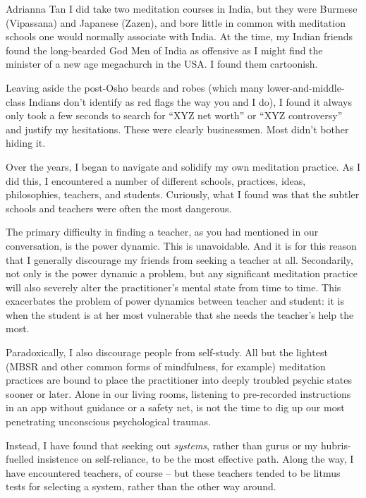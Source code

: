 \documentclass{letter}
\newcommand\hr{\par\vspace{-.5\ht\strutbox}\noindent\hrulefill\par}
\begin{document}
\begin{letter}{Adrianna Tan}
I did take two meditation courses in India, but they were Burmese (Vipassana) and Japanese (Zazen), and bore little in common with meditation schools one would normally associate with India.
At the time, my Indian friends found the long-bearded God Men of India as offensive as I might find the minister of a new age megachurch in the USA.
I found them cartoonish.

Leaving aside the post-Osho beards and robes (which many lower-and-middle-class Indians don't identify as red flags the way you and I do), I found it always only took a few seconds to search for ``XYZ net worth'' or ``XYZ controversy'' and justify my hesitations.
These were clearly businessmen.
Most didn't bother hiding it.

Over the years, I began to navigate and solidify my own meditation practice.
As I did this, I encountered a number of different schools, practices, ideas, philosophies, teachers, and students.
Curiously, what I found was that the subtler schools and teachers were often the most dangerous.

\hr

The primary difficulty in finding a teacher, as you had mentioned in our conversation, is the power dynamic.
This is unavoidable.
And it is for this reason that I generally discourage my friends from seeking a teacher at all.
Secondarily, not only is the power dynamic a problem, but any significant meditation practice will also severely alter the practitioner's mental state from time to time.
This exacerbates the problem of power dynamics between teacher and student: it is when the student is at her most vulnerable that she needs the teacher's help the most.

Paradoxically, I also discourage people from self-study.
All but the lightest (MBSR and other common forms of mindfulness, for example) meditation practices are bound to place the practitioner into deeply troubled psychic states sooner or later.
Alone in our living rooms, listening to pre-recorded instructions in an app without guidance or a safety net, is not the time to dig up our most penetrating unconscious psychological traumas.

Instead, I have found that seeking out \textit{systems}, rather than gurus or my hubris-fuelled insistence on self-reliance, to be the most effective path.
Along the way, I have encountered teachers, of course -- but these teachers tended to be litmus tests for selecting a system, rather than the other way around.

\hr


\end{letter}
\end{document}
